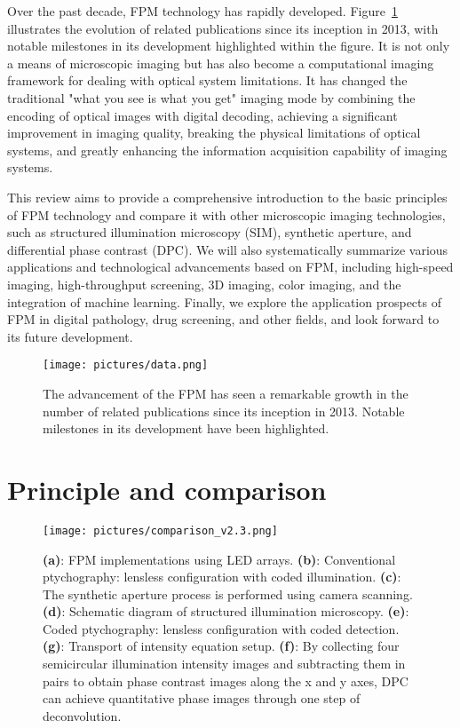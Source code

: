 \documentclass[journal,review,submit,pdftex,moreauthors]{Definitions/mdpi}
\begin{document}
Over the past decade, FPM technology has rapidly developed. Figure~\ref{data} illustrates the evolution of related publications since its inception in 2013, with notable milestones in its development highlighted within the figure. It is not only a means of microscopic imaging but has also become a computational imaging framework for dealing with optical system limitations. It has changed the traditional "what you see is what you get" imaging mode by combining the encoding of optical images with digital decoding, achieving a significant improvement in imaging quality, breaking the physical limitations of optical systems, and greatly enhancing the information acquisition capability of imaging systems.

This review aims to provide a comprehensive introduction to the basic principles of FPM technology and compare it with other microscopic imaging technologies, such as structured illumination microscopy (SIM), synthetic aperture, and differential phase contrast (DPC). We will also systematically summarize various applications and technological advancements based on FPM, including high-speed imaging, high-throughput screening, 3D imaging, color imaging, and the integration of machine learning. Finally, we explore the application prospects of FPM in digital pathology, drug screening, and other fields, and look forward to its future development.

\begin{figure}[H]
\texttt{[image: pictures/data.png]}
\caption{The advancement of the FPM has seen a remarkable growth in the number of related publications since its inception in 2013. Notable milestones in its development have been highlighted.\label{data}}
\end{figure}  

\section{Principle and comparison}

\begin{figure}[H]
    \centering
    \texttt{[image: pictures/comparison\_v2.3.png]}
    \caption{\textbf{(a)}: FPM implementations using LED arrays.
    \textbf{(b)}: Conventional ptychography: lensless configuration with coded illumination.
     \textbf{(c)}: The synthetic aperture process is performed using camera scanning.
     \textbf{(d)}:  Schematic  diagram  of  structured  illumination  microscopy.
     \textbf{(e)}: Coded ptychography: lensless configuration with coded detection.
     \textbf{(g)}: Transport of intensity equation setup.
     \textbf{(f)}: By collecting four semicircular illumination intensity images and subtracting them in pairs to obtain phase contrast images along the x and y axes, DPC can achieve quantitative phase images through one step of deconvolution.
    }
    \label{fig:enter-label}
\end{figure}
\end{document}
